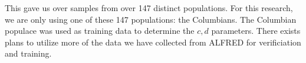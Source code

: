 This gave us over samples from over 147 distinct populations.
For this research, we are only using one of these 147 populations: the Columbians.
The Columbian populace was used as training data to determine the $c, d$ parameters.
There exists plans to utilize more of the data we have collected from ALFRED for verificiation and training.
